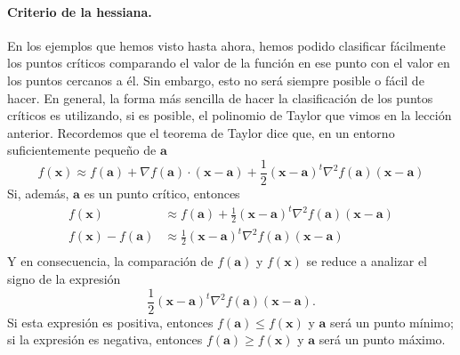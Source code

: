 \paragraph{Criterio de la hessiana.}
En los ejemplos que hemos visto hasta ahora, hemos podido clasificar fácilmente los puntos críticos comparando el valor de la función en ese punto con el valor en los puntos cercanos a él.
Sin embargo, esto no será siempre posible o fácil de hacer.
En general, la forma más sencilla de hacer la clasificación de los puntos críticos es utilizando, si es posible, el polinomio de Taylor que vimos en la lección anterior.
Recordemos que el teorema de Taylor dice que, en un entorno suficientemente pequeño de $\boldsymbol a$
\[
f(\boldsymbol x) \approx
f(\boldsymbol{a})+\nabla f(\boldsymbol{a})\cdot(\boldsymbol x-\boldsymbol a)
+\frac{1}{2}(\boldsymbol x-\boldsymbol a)^t\nabla^2f(\boldsymbol{a})(\boldsymbol x-\boldsymbol a)
\]
Si, además, $\boldsymbol a$ es un punto crítico, entonces
\begin{align*}
f(\boldsymbol x) &\approx
f(\boldsymbol{a})+\frac{1}{2}(\boldsymbol x-\boldsymbol a)^t\nabla^2f(\boldsymbol{a})
(\boldsymbol x-\boldsymbol a)\\
f(\boldsymbol x) - f(\boldsymbol{a})
&\approx\frac{1}{2}(\boldsymbol x-\boldsymbol a)^t\nabla^2f(\boldsymbol{a})
(\boldsymbol x-\boldsymbol a)\\
\end{align*}
Y en consecuencia, la comparación de $f(\boldsymbol a)$ y $f(\boldsymbol x)$ se reduce a analizar el signo de la expresión
\[
\frac{1}{2}(\boldsymbol x-\boldsymbol a)^t\nabla^2f(\boldsymbol{a})(\boldsymbol x-\boldsymbol a).
\]
Si esta expresión es positiva, entonces $f(\boldsymbol a)\le f(\boldsymbol x)$ y $\boldsymbol a$ será un punto mínimo;
si la expresión es negativa, entonces $f(\boldsymbol a)\ge f(\boldsymbol x)$ y $\boldsymbol a$ será un punto máximo.

